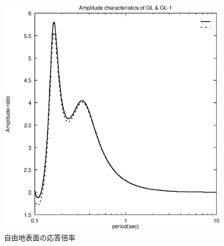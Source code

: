\documentclass[titlepage]{jsarticle}
\begin{document}
\begin{figure}[htbp]
\begin{center}
\includegraphics[scale=0.7]{trans.eps}
\caption{自由地表面の応答倍率}
\label{trans}
\end{center}
\end{figure}
\end{document}
